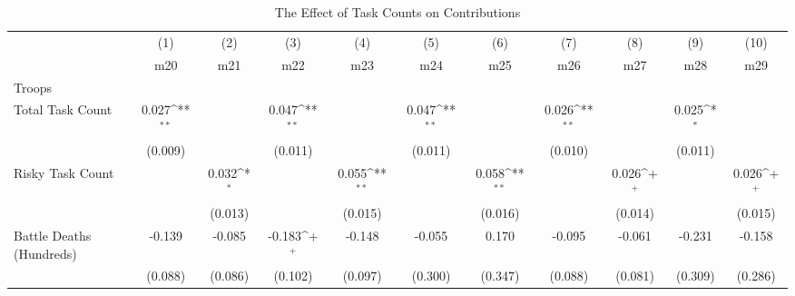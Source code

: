 \begin{table}[htbp]\centering
\def\sym#1{\ifmmode^{#1}\else\(^{#1}\)\fi}
\caption{The Effect of Task Counts on Contributions \label{Table 2}}
\begin{tabular}{l*{10}{c}}
\hline\hline
                    &\multicolumn{1}{c}{(1)}        &\multicolumn{1}{c}{(2)}        &\multicolumn{1}{c}{(3)}        &\multicolumn{1}{c}{(4)}        &\multicolumn{1}{c}{(5)}        &\multicolumn{1}{c}{(6)}        &\multicolumn{1}{c}{(7)}        &\multicolumn{1}{c}{(8)}        &\multicolumn{1}{c}{(9)}        &\multicolumn{1}{c}{(10)}        \\
                    &         m20        &         m21        &         m22        &         m23        &         m24        &         m25        &         m26        &         m27        &         m28        &         m29        \\
\hline
Troops              &                    &                    &                    &                    &                    &                    &                    &                    &                    &                    \\
Total Task Count    &       0.027\sym{**}&                    &       0.047\sym{**}&                    &       0.047\sym{**}&                    &       0.026\sym{**}&                    &       0.025\sym{*} &                    \\
                    &     (0.009)        &                    &     (0.011)        &                    &     (0.011)        &                    &     (0.010)        &                    &     (0.011)        &                    \\
[1em]
Risky Task Count    &                    &       0.032\sym{*} &                    &       0.055\sym{**}&                    &       0.058\sym{**}&                    &       0.026\sym{+} &                    &       0.026\sym{+} \\
                    &                    &     (0.013)        &                    &     (0.015)        &                    &     (0.016)        &                    &     (0.014)        &                    &     (0.015)        \\
[1em]
Battle Deaths (Hundreds)&      -0.139        &      -0.085        &      -0.183\sym{+} &      -0.148        &      -0.055        &       0.170        &      -0.095        &      -0.061        &      -0.231        &      -0.158        \\
                    &     (0.088)        &     (0.086)        &     (0.102)        &     (0.097)        &     (0.300)        &     (0.347)        &     (0.088)        &     (0.081)        &     (0.309)        &     (0.286)        \\

\end{tabular}
\end{table}
